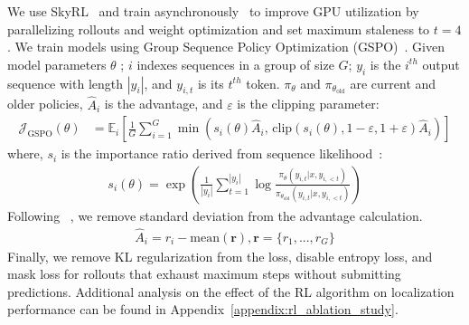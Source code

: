 We use SkyRL~\citep{griggs2025skrylv01} and train asynchronously~\citep{fu2026areallargescaleasynchronousreinforcement} to improve GPU utilization by parallelizing rollouts and weight optimization and set maximum staleness to $t=4$. 
We train models using Group Sequence Policy Optimization (GSPO)~\citep{zheng2025groupsequencepolicyoptimization}. Given model parameters $\theta$ ; $i$ indexes sequences in a group of size $G$; $y_i$ is the $i^{th}$ output sequence with length $|y_i|$, and $y_{i,t}$ is its $t^{th}$ token. $\pi_\theta$ and $\pi_{\theta_{\text{old}}}$ are current and older policies, $\hat{A}_i$ is the advantage, and $\varepsilon$ is the clipping parameter:
{
\small %
\begin{align}
    \mathcal{J}_{\text{GSPO}}(\theta) &= 
    \mathbb{E}_i \left[ \frac{1}{G} \sum_{i=1}^{G} \min\left( s_i(\theta) \hat{A}_i,\, \text{clip}\left( s_i(\theta), 1-\varepsilon, 1+\varepsilon \right) \hat{A}_i \right) \right]
    \label{eq:gspo}
\end{align}
}
where,  $s_i$ is the importance ratio derived from sequence likelihood~\citep{zheng-etal-2023-click}:
\begin{align}
    s_i(\theta) = \exp\left( \frac{1}{|y_i|} \sum_{t=1}^{|y_i|} \log \frac{\pi_\theta(y_{i,t} | x, y_{i,<t})}{\pi_{\theta_{\text{old}}}(y_{i,t} | x, y_{i,<t})} \right)
    \label{eq:is}
\end{align}
Following ~\citet{liu2025understandingr1zeroliketrainingcritical}, we remove standard deviation from the advantage calculation.
\begin{align}
    \hat{A}_i = r_i - \text{mean}(\mathbf{r}), \mathbf{r} = \{r_1, ..., r_G\}
\end{align}
Finally, we remove KL regularization from the loss, disable entropy loss, and mask loss for rollouts that exhaust maximum steps without submitting predictions. Additional analysis on the effect of the RL algorithm on localization performance can be found in Appendix~\ref{appendix:rl_ablation_study}.